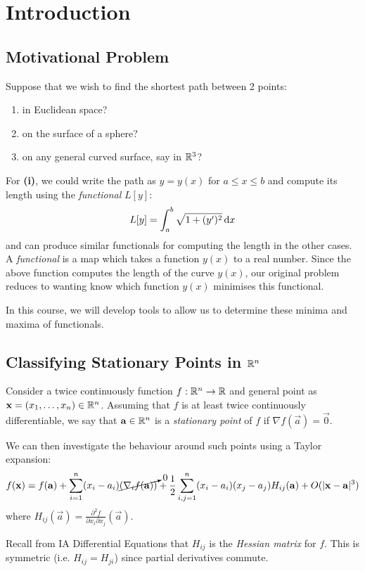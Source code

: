 \documentclass[../main.tex]{subfiles}
\begin{document}
\chapter{Introduction}
\section{Motivational Problem}
Suppose that we wish to find the shortest path between 2 points:
\begin{enumerate}
  \item in Euclidean space?
  \item on the surface of a sphere?
  \item on any general curved surface, say in $\R^{3}$?
\end{enumerate}
For \textbf{(i)}, we could write the path as $y = y(x)$ for $a \leq x \leq b$ and compute its length using the \textit{functional} $L[y]$:
\[
  L[y] = \int_{a}^{b} \sqrt{1 + (y')^2} \d{x}
\]
and can produce similar functionals for computing the length in the other cases.
A \textit{functional} is a map which takes a function $y(x)$ to a real number.
Since the above function computes the length of the curve $y(x)$, our original problem reduces to wanting know which function $y(x)$ minimises this functional.

In this course, we will develop tools to allow us to determine these minima and maxima of functionals.
\section{\texorpdfstring{Classifying Stationary Points in $\R^{n}$}{Classifying Stationary Points in n-dimensions}} \label{classifyingStatPts}
Consider a twice continuously function $f: \R^{n} \to \R$ and general point as $\vec{x} = (x_1, \ldots, x_n) \in \R^{n}$.
Assuming that $f$ is at least twice continuously differentiable, we say that $\vec{a} \in \R^{n}$ is a \textit{stationary point} of $f$ if $\nabla f(\vec{a}) = \vec{0}$.

We can then investigate the behaviour around such points using a Taylor expansion:
\[
  f(\vec{x}) = f(\vec{a}) + \sum_{i = 1}^{n} (x_i - a_i)\cancelto{0}{(\nabla_i f(\vec{a}))} + \frac{1}{2}\sum_{i, j = 1}^{n} (x_i - a_i)(x_j - a_j)H_{ij}(\vec{a}) + O(|\vec{x} - \vec{a}|^3)
\]
where $H_{i j}(\vec{a}) = \frac{\partial^2 f}{\partial x_i \partial x_j}(\vec{a})$.
\begin{remark}[Recap]
  Recall from IA Differential Equations that $H_{i j}$ is the \textit{Hessian matrix} for $f$.
  This is symmetric (i.e. $H_{i j} = H_{j i}$) since partial derivatives commute.
\end{remark}
\end{document}
